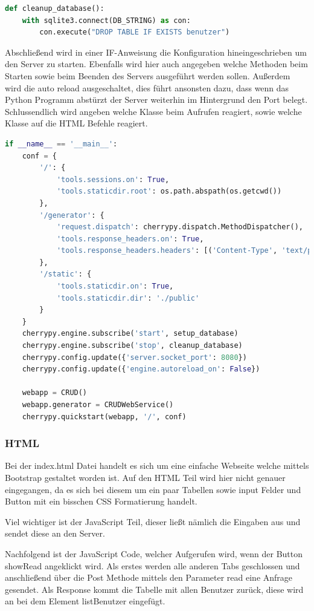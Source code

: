\begin{lstlisting}[language=Python, caption=Löschen der Tabelle benutzer beim Beenden des Servers]
def cleanup_database():
	with sqlite3.connect(DB_STRING) as con:
		con.execute("DROP TABLE IF EXISTS benutzer")
\end{lstlisting}

Abschließend wird in einer IF-Anweisung die Konfiguration hineingeschrieben um den Server zu starten. Ebenfalls wird hier auch angegeben welche Methoden beim Starten sowie beim Beenden des Servers ausgeführt werden sollen. Außerdem wird die auto reload ausgeschaltet, dies führt ansonsten dazu, dass wenn das Python Programm abstürzt der Server weiterhin im Hintergrund den Port belegt. Schlussendlich wird angeben welche Klasse beim Aufrufen reagiert, sowie welche Klasse auf die HTML Befehle reagiert.  

\begin{lstlisting}[language=Python, caption=Konfiguration des Servers]
if __name__ == '__main__':
	conf = {
		'/': {
			'tools.sessions.on': True,
			'tools.staticdir.root': os.path.abspath(os.getcwd())
		},
		'/generator': {
			'request.dispatch': cherrypy.dispatch.MethodDispatcher(),
			'tools.response_headers.on': True,
			'tools.response_headers.headers': [('Content-Type', 'text/plain')],
		},
		'/static': {
			'tools.staticdir.on': True,
			'tools.staticdir.dir': './public'
		}
	}
	cherrypy.engine.subscribe('start', setup_database)
	cherrypy.engine.subscribe('stop', cleanup_database)
	cherrypy.config.update({'server.socket_port': 8080})
	cherrypy.config.update({'engine.autoreload_on': False})
	
	webapp = CRUD()
	webapp.generator = CRUDWebService()
	cherrypy.quickstart(webapp, '/', conf)
\end{lstlisting}

\subsubsection{HTML}

Bei der index.html Datei handelt es sich um eine einfache Webseite welche mittels Bootstrap gestaltet worden ist. Auf den HTML Teil wird hier nicht genauer eingegangen, da es sich bei diesem um ein paar Tabellen sowie input Felder und Button mit ein bisschen CSS Formatierung handelt.

Viel wichtiger ist der JavaScript Teil, dieser ließt nämlich die Eingaben aus und sendet diese an den Server.

Nachfolgend ist der JavaScript Code, welcher Aufgerufen wird, wenn der Button showRead angeklickt wird. Als erstes werden alle anderen Tabs geschlossen und anschließend über die Post Methode mittels den Parameter read eine Anfrage gesendet. Als Response kommt die Tabelle mit allen Benutzer zurück, diese wird an bei dem Element listBenutzer eingefügt.

